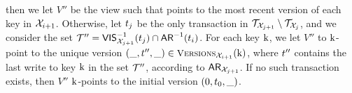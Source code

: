{\begin{itemize}
then we let $V''$ be the view such that points to the 
most recent version of each key in $\mathcal{X}_{i+1}$. Otherwise, let $t_{j}$ be the 
only transaction in $\mathcal{T}_{\mathcal{X}_{j+1}} \setminus \mathcal{T}_{\mathcal{X}_{j}}$, and we consider 
the set $\mathcal{T}'' = {\mathsf{VIS}}^{-1}_{\mathcal{X}_{j+1}}(t_{j}) \cap {\sf{AR}}^{-1}(t_{i})$. 
For each key $\mathrm{k}$, we let $V''$ to $\mathrm{k}$-point to the unique version $(\_, \tsid'', \_) \in 
\Versions_{\aexec_{i+1}}(\key{k})$, where $t''$ contains the last write to key $\mathrm{k}$ 
in the set $\mathcal{T}''$, according to ${\sf{AR}}_{\mathcal{X}_{j+1}}$. If no such transaction exists, then 
$V''$ $\mathrm{k}$-points to the initial version $(0, t_0, \_)$.

\end{itemize}

}
